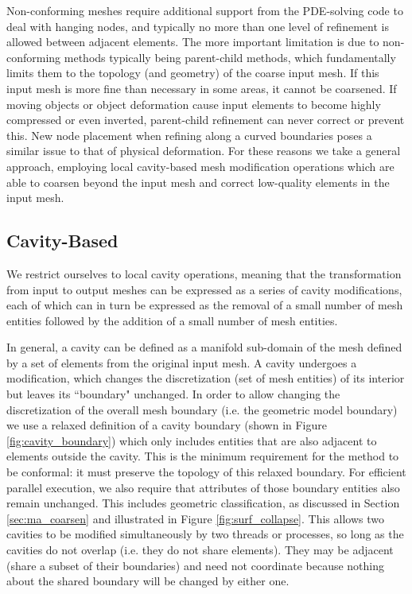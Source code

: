 Non-conforming meshes require additional support from
the PDE-solving code to deal with hanging nodes, and typically
no more than one level of refinement is allowed between adjacent
elements.
The more important limitation is due to non-conforming methods
typically being parent-child methods, which fundamentally limits
them to the topology (and geometry) of the coarse input mesh.
If this input mesh is more fine than necessary in some areas,
it cannot be coarsened.
If moving objects or object deformation cause input elements
to become highly compressed or even inverted, parent-child
refinement can never correct or prevent this.
New node placement when refining along a curved boundaries poses
a similar issue to that of physical deformation.
For these reasons we take a general approach, employing
local cavity-based mesh modification operations which are
able to coarsen beyond the input mesh and correct low-quality
elements in the input mesh.

\subsection{Cavity-Based}
\label{sec:cavity}

We restrict ourselves to local cavity operations,
meaning that the transformation from input to output meshes
can be expressed as a series of cavity modifications, each
of which can in turn be expressed as the removal of
a small number of mesh entities followed by the addition
of a small number of mesh entities.

In general, a cavity can be defined as a manifold sub-domain
of the mesh defined by a set of elements from the original
input mesh.
A cavity undergoes a modification, which changes the discretization
(set of mesh entities) of its interior but leaves its ``boundary" unchanged.
In order to allow changing the discretization of the overall
mesh boundary (i.e. the geometric model boundary)
we use a relaxed definition of a cavity boundary
(shown in Figure \ref{fig:cavity_boundary}) which only includes
entities that are also adjacent to elements outside the cavity.
This is the minimum requirement for the method to be conformal:
it must preserve the topology of this relaxed boundary.
For efficient parallel execution, we also require that attributes
of those boundary entities also remain unchanged.
This includes geometric classification, as discussed in Section
\ref{sec:ma_coarsen} and illustrated in Figure \ref{fig:surf_collapse}.
This allows two cavities to be modified simultaneously by two
threads or processes, so long as the cavities do not overlap
(i.e. they do not share elements).
They may be adjacent (share a subset of their boundaries) and
need not coordinate because nothing about the shared boundary
will be changed by either one.

